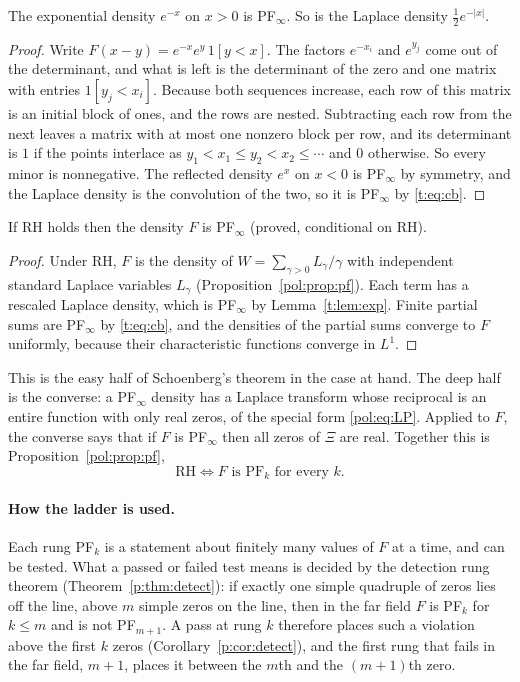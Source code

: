 \begin{lemma}\label{t:lem:exp}
The exponential density $e^{-x}$ on $x>0$ is PF$_\infty$. So is the Laplace density $\frac12e^{-|x|}$.
\end{lemma}

\begin{proof}
Write $F(x-y)=e^{-x}e^{y}\,1[y<x]$. The factors $e^{-x_i}$ and $e^{y_j}$ come out of the determinant, and what is left is the determinant of the zero and one matrix with entries $1[y_j<x_i]$. Because both sequences increase, each row of this matrix is an initial block of ones, and the rows are nested. Subtracting each row from the next leaves a matrix with at most one nonzero block per row, and its determinant is $1$ if the points interlace as $y_1<x_1\le y_2<x_2\le\cdots$ and $0$ otherwise. So every minor is nonnegative. The reflected density $e^{x}$ on $x<0$ is PF$_\infty$ by symmetry, and the Laplace density is the convolution of the two, so it is PF$_\infty$ by \eqref{t:eq:cb}.
\end{proof}

\begin{proposition}\label{t:prop:easy}
If RH holds then the density $F$ is PF$_\infty$ (proved, conditional on RH).
\end{proposition}

\begin{proof}
Under RH, $F$ is the density of $W=\sum_{\gamma>0}L_\gamma/\gamma$ with independent standard Laplace variables $L_\gamma$ (Proposition~\ref{pol:prop:pf}). Each term has a rescaled Laplace density, which is PF$_\infty$ by Lemma~\ref{t:lem:exp}. Finite partial sums are PF$_\infty$ by \eqref{t:eq:cb}, and the densities of the partial sums converge to $F$ uniformly, because their characteristic functions converge in $L^1$.
\end{proof}

This is the easy half of Schoenberg's theorem in the case at hand. The deep half is the converse: a PF$_\infty$ density has a Laplace transform whose reciprocal is an entire function with only real zeros, of the special form \eqref{pol:eq:LP}. Applied to $F$, the converse says that if $F$ is PF$_\infty$ then all zeros of $\Xi$ are real. Together this is Proposition~\ref{pol:prop:pf},
\[
\text{RH}\iff F\text{ is PF}_k\text{ for every }k .
\]

\paragraph{How the ladder is used.} Each rung PF$_k$ is a statement about finitely many values of $F$ at a time, and can be tested. What a passed or failed test means is decided by the detection rung theorem (Theorem~\ref{p:thm:detect}): if exactly one simple quadruple of zeros lies off the line, above $m$ simple zeros on the line, then in the far field $F$ is PF$_k$ for $k\le m$ and is not PF$_{m+1}$. A pass at rung $k$ therefore places such a violation above the first $k$ zeros (Corollary~\ref{p:cor:detect}), and the first rung that fails in the far field, $m+1$, places it between the $m$th and the $(m+1)$th zero.
